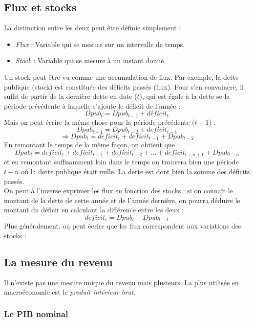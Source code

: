 \documentclass[10pt]{book}
\begin{document}
\subsection{Flux et stocks}
La distinction entre les deux peut être définie simplement : 
\begin{itemize}
  \item \textit{Flux} : Variable qui se mesure sur un intervalle de temps.
  \item \textit{Stock} : Variable qui se mesure à un instant donné.
\end{itemize}
Un stock peut être vu comme une accumulation de flux. Par exemple, la dette publique (stock) est constituée des déficits passés (flux). Pour s'en convaincre, il suffit de partir de la dernière dette en date ($t$), qui est égale à la dette se la période précédente à laquelle s'ajoute le déficit de l'année :
$$ Dpub_t = Dpub_{t-1} + déficit_t $$
Mais on peut écrire la même chose pour la période précédente ($t-1$) :
$$ Dpub_{t-1} = Dpub_{t-2} + deficit_{t-1} $$
$$ \Rightarrow Dpub_{t} = deficit_t + deficit_{t-1} + Dpub_{t-2}$$
En remontant le temps de la même façon, on obtient que :
$$Dpub_t = deficit_t + deficit_{t-1} + deficit_{t-2} + ... + deficit_{t-n+1} + Dpub_{t-n}$$
et en remontant suffisamment loin dans le temps on trouvera bien une période $t-n$ où la dette publique était nulle. La dette est dont bien la somme des déficits passés. \\
On peut à l'inverse exprimer les flux en fonction des stocks : si on connaît le montant de la dette de cette année et de l'année dernière, on pourra déduire le montant du déficit en calculant la différence entre les deux :
$$deficit_t = Dpub_t -  Dpub_{t-1}$$
Plus généralement, on peut écrire que les flux correspondent aux variations des stocks : 
\begin{center}
\end{center}
\subsection{La mesure du revenu}
Il n'existe pas une mesure unique du revenu mais plusieurs. La plus utilisée en macroéconomie est le \textit{produit intérieur brut}.
\subsubsection{Le PIB nominal}
\end{document}
